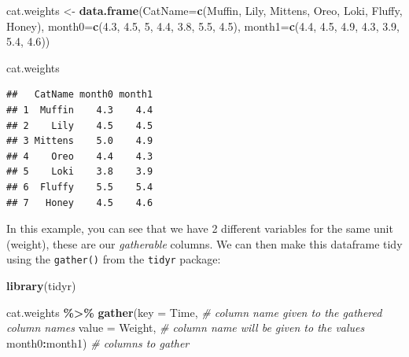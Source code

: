 \documentclass[
]{book}
\newenvironment{Shaded}{\begin{snugshade}}{\end{snugshade}}
\newcommand{\AttributeTok}[1]{\textcolor[rgb]{0.13,0.29,0.53}{#1}}
\newcommand{\CommentTok}[1]{\textcolor[rgb]{0.56,0.35,0.01}{\textit{#1}}}
\newcommand{\DecValTok}[1]{\textcolor[rgb]{0.00,0.00,0.81}{#1}}
\newcommand{\FloatTok}[1]{\textcolor[rgb]{0.00,0.00,0.81}{#1}}
\newcommand{\FunctionTok}[1]{\textcolor[rgb]{0.13,0.29,0.53}{\textbf{#1}}}
\newcommand{\NormalTok}[1]{#1}
\newcommand{\OtherTok}[1]{\textcolor[rgb]{0.56,0.35,0.01}{#1}}
\newcommand{\SpecialCharTok}[1]{\textcolor[rgb]{0.81,0.36,0.00}{\textbf{#1}}}
\newcommand{\StringTok}[1]{\textcolor[rgb]{0.31,0.60,0.02}{#1}}
\begin{document}
\begin{Shaded}
\begin{Highlighting}[]
\NormalTok{cat.weights }\OtherTok{\textless{}{-}} \FunctionTok{data.frame}\NormalTok{(}\AttributeTok{CatName=}\FunctionTok{c}\NormalTok{(}\StringTok{\textquotesingle{}Muffin\textquotesingle{}}\NormalTok{, }\StringTok{\textquotesingle{}Lily\textquotesingle{}}\NormalTok{, }\StringTok{\textquotesingle{}Mittens\textquotesingle{}}\NormalTok{, }\StringTok{\textquotesingle{}Oreo\textquotesingle{}}\NormalTok{, }\StringTok{\textquotesingle{}Loki\textquotesingle{}}\NormalTok{, }\StringTok{\textquotesingle{}Fluffy\textquotesingle{}}\NormalTok{, }\StringTok{\textquotesingle{}Honey\textquotesingle{}}\NormalTok{),}
                          \AttributeTok{month0=}\FunctionTok{c}\NormalTok{(}\FloatTok{4.3}\NormalTok{, }\FloatTok{4.5}\NormalTok{, }\DecValTok{5}\NormalTok{, }\FloatTok{4.4}\NormalTok{, }\FloatTok{3.8}\NormalTok{, }\FloatTok{5.5}\NormalTok{, }\FloatTok{4.5}\NormalTok{),}
                          \AttributeTok{month1=}\FunctionTok{c}\NormalTok{(}\FloatTok{4.4}\NormalTok{, }\FloatTok{4.5}\NormalTok{, }\FloatTok{4.9}\NormalTok{, }\FloatTok{4.3}\NormalTok{, }\FloatTok{3.9}\NormalTok{, }\FloatTok{5.4}\NormalTok{, }\FloatTok{4.6}\NormalTok{))}

\NormalTok{cat.weights}
\end{Highlighting}
\end{Shaded}

\begin{verbatim}
##   CatName month0 month1
## 1  Muffin    4.3    4.4
## 2    Lily    4.5    4.5
## 3 Mittens    5.0    4.9
## 4    Oreo    4.4    4.3
## 5    Loki    3.8    3.9
## 6  Fluffy    5.5    5.4
## 7   Honey    4.5    4.6
\end{verbatim}

In this example, you can see that we have 2 different variables for the same unit (weight), these are our \emph{gatherable} columns.
We can then make this dataframe tidy using the \texttt{gather()} from the \texttt{tidyr} package:

\begin{Shaded}
\begin{Highlighting}[]
\FunctionTok{library}\NormalTok{(tidyr)}

\NormalTok{cat.weights }\SpecialCharTok{\%\textgreater{}\%} 
  \FunctionTok{gather}\NormalTok{(}\AttributeTok{key =}\NormalTok{ Time, }\CommentTok{\# column name given to the gathered column names}
         \AttributeTok{value =}\NormalTok{ Weight, }\CommentTok{\# column name will be given to the values}
\NormalTok{         month0}\SpecialCharTok{:}\NormalTok{month1) }\CommentTok{\# columns to gather}
\end{Highlighting}
\end{Shaded}
\end{document}
